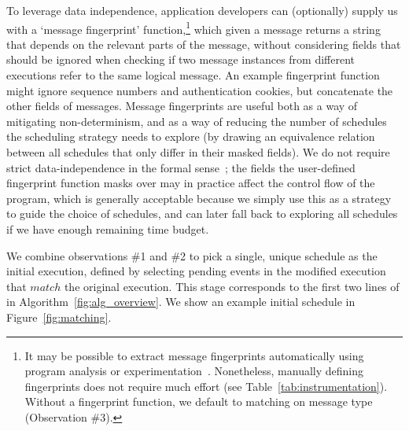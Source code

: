 To leverage data independence, application developers can (optionally) supply us
with a `message fingerprint' function,\footnote{It may be possible to extract
message fingerprints automatically using program analysis or experimentation~\cite{diffy}.
Nonetheless, manually defining fingerprints does not require much effort (see
Table~\ref{tab:instrumentation}). Without a fingerprint function, we default
to matching on message type (Observation \#3).}
which given a message returns a string that depends on the relevant parts of the message,
without considering fields that should be ignored when checking if two message instances from
different executions refer to the same logical message.
An example fingerprint function might ignore sequence numbers and authentication cookies, but
concatenate the other fields of messages.
Message fingerprints are useful both as a way of mitigating non-determinism, and as a way of
reducing the number of schedules the scheduling strategy needs to explore (by drawing an equivalence relation
between all schedules that only differ in their masked fields).
We do not require strict data-independence in the formal
sense~\cite{shacham2014verifying}; the fields the user-defined fingerprint
function masks over may in practice affect the control flow of the program,
which is generally acceptable because we simply use this as a strategy to guide the
choice of schedules, and can later fall back to exploring all schedules if we
have enough remaining time budget.



We combine observations \#1 and \#2 to pick a single, unique
schedule as the initial execution, defined by selecting pending events in
the modified execution that $match$ the original execution.
This stage corresponds to the first two lines of  in
Algorithm~\ref{fig:alg_overview}. We
show an example initial schedule in Figure~\ref{fig:matching}.


